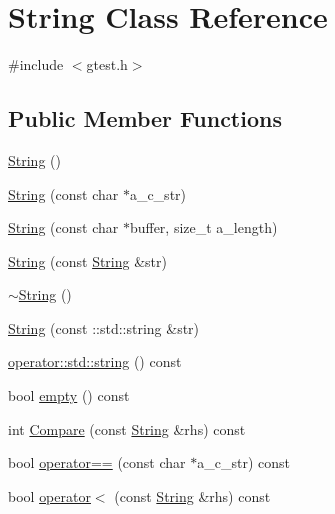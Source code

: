 \hypertarget{classtesting_1_1internal_1_1String}{\section{\-String \-Class \-Reference}
\label{d2/df8/classtesting_1_1internal_1_1String}
}


{\ttfamily \#include $<$gtest.\-h$>$}

\subsection*{\-Public \-Member \-Functions}
\begin{DoxyCompactItemize}
\item 
\hyperlink{classtesting_1_1internal_1_1String_a8db865e64c3c3f65ec6a0b6fd8c09a94}{\-String} ()
\item 
\hyperlink{classtesting_1_1internal_1_1String_a09f57f38d35cb64db81a3e7bfefd6b0b}{\-String} (const char $\ast$a\-\_\-c\-\_\-str)
\item 
\hyperlink{classtesting_1_1internal_1_1String_af4ba9a07bb72590a666527e76f90e6f8}{\-String} (const char $\ast$buffer, size\-\_\-t a\-\_\-length)
\item 
\hyperlink{classtesting_1_1internal_1_1String_a326f0bd688ed2b378c3672cc93688e2e}{\-String} (const \hyperlink{classtesting_1_1internal_1_1String}{\-String} \&str)
\item 
\hyperlink{classtesting_1_1internal_1_1String_a998ab66c7adb23a76179eec57d05de9d}{$\sim$\-String} ()
\item 
\hyperlink{classtesting_1_1internal_1_1String_a81736a539597c8a4ca1f77187475a41b}{\-String} (const \-::std\-::string \&str)
\item 
\hyperlink{classtesting_1_1internal_1_1String_a079ba7a66275d60e382981eb7a421f82}{operator\-::std\-::string} () const 
\item 
bool \hyperlink{classtesting_1_1internal_1_1String_ac6e61de369e994009e36f344f99c15ad}{empty} () const 
\item 
int \hyperlink{classtesting_1_1internal_1_1String_a454019802adc8561c0f1cf3c9564d682}{\-Compare} (const \hyperlink{classtesting_1_1internal_1_1String}{\-String} \&rhs) const 
\item 
bool \hyperlink{classtesting_1_1internal_1_1String_aa0fc39e751abca6274ba296779e9ec0e}{operator==} (const char $\ast$a\-\_\-c\-\_\-str) const 
\item 
bool \hyperlink{classtesting_1_1internal_1_1String_a7aac1e703aebb33a2cb1aab0e3e36ea7}{operator$<$} (const \hyperlink{classtesting_1_1internal_1_1String}{\-String} \&rhs) const 

\end{DoxyCompactItemize}

